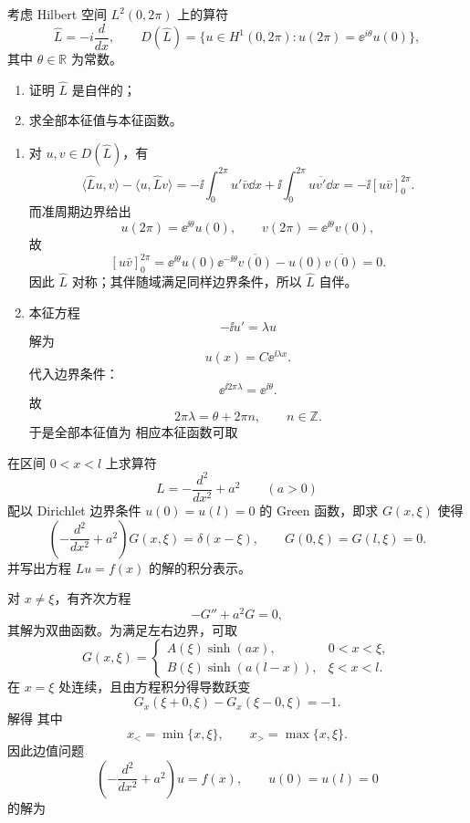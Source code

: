 \begin{question}
考虑 Hilbert 空间 $L^2(0,2\pi)$ 上的算符
\[
\hat L=-i\frac{d}{dx},
\qquad
D(\hat L)=\{u\in H^1(0,2\pi):u(2\pi)=\ee^{i\theta}u(0)\},
\]
其中 $\theta\in\mathbb R$ 为常数。
\begin{enumerate}[label=(\arabic*),leftmargin=2.8em,itemsep=0.2em]
\item 证明 $\hat L$ 是自伴的；
\item 求全部本征值与本征函数。
\end{enumerate}
\begin{solution}

\begin{enumerate}[label=(\arabic*),leftmargin=2.8em,itemsep=0.2em]
\item 对 $u,v\in D(\hat L)$，有
\[
\langle \hat L u,v\rangle-\langle u,\hat L v\rangle
=-\ii\int_0^{2\pi}u'\bar v\dd{x}+\ii\int_0^{2\pi}u\overline{v'}\dd{x}
=-\ii[u\bar v]_0^{2\pi}.
\]
而准周期边界给出
\[
u(2\pi)=\ee^{\ii\theta}u(0),\qquad v(2\pi)=\ee^{\ii\theta}v(0),
\]
故
\[
[u\bar v]_0^{2\pi}=\ee^{\ii\theta}u(0)\ee^{-\ii\theta}\overline{v(0)}-u(0)\overline{v(0)}=0.
\]
因此 $\hat L$ 对称；其伴随域满足同样边界条件，所以 $\hat L$ 自伴。

\item 本征方程
\[
 -\ii u'=\lambda u
\]
解为
\[
u(x)=C \ee^{\ii\lambda x}.
\]
代入边界条件：
\[
\ee^{\ii2\pi\lambda}=\ee^{\ii\theta}.
\]
故
\[
2\pi\lambda=\theta+2\pi n,
\qquad n\in\mathbb Z.
\]
于是全部本征值为
相应本征函数可取
\end{enumerate}
\end{solution}
\end{question}

\begin{question}
在区间 $0<x<l$ 上求算符
\[
L=-\frac{d^2}{dx^2}+a^2\qquad (a>0)
\]
配以 Dirichlet 边界条件 $u(0)=u(l)=0$ 的 Green 函数，即求 $G(x,\xi)$ 使得
\[
\left(-\frac{d^2}{dx^2}+a^2\right)G(x,\xi)=\delta(x-\xi),
\qquad G(0,\xi)=G(l,\xi)=0.
\]
并写出方程 $Lu=f(x)$ 的解的积分表示。
\begin{solution}

对 $x\neq \xi$，有齐次方程
\[
-G''+a^2G=0,
\]
其解为双曲函数。为满足左右边界，可取
\[
G(x,\xi)=
\begin{cases}
A(\xi)\sinh(ax), & 0<x<\xi,\\
B(\xi)\sinh(a(l-x)), & \xi<x<l.
\end{cases}
\]
在 $x=\xi$ 处连续，且由方程积分得导数跃变
\[
G_x(\xi+0,\xi)-G_x(\xi-0,\xi)=-1.
\]
解得
其中
\[
x_<=\min\{x,\xi\},\qquad x_>=\max\{x,\xi\}.
\]
因此边值问题
\[
\left(-\frac{d^2}{dx^2}+a^2\right)u=f(x),
\qquad u(0)=u(l)=0
\]
的解为
\end{solution}
\end{question}


